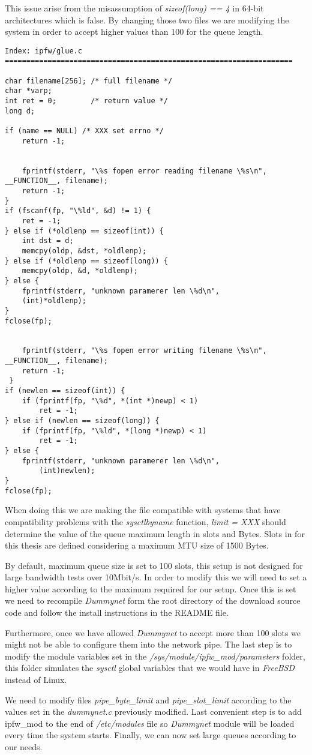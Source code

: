 This issue arise from the misassumption of {\it sizeof(long) == 4} in 64-bit architectures which is false. By changing those two files we are modifying the system in order to accept higher values than 100 for the queue length.

\lstset{language=C}
\begin{lstlisting}
Index: ipfw/glue.c
===================================================================

char filename[256];	/* full filename */
char *varp;
int ret = 0;		/* return value */
long d;
 
if (name == NULL) /* XXX set errno */
	return -1;


	fprintf(stderr, "\%s fopen error reading filename \%s\n", __FUNCTION__, filename);
	return -1;
}
if (fscanf(fp, "\%ld", &d) != 1) {
	ret = -1;
} else if (*oldlenp == sizeof(int)) {
	int dst = d;
	memcpy(oldp, &dst, *oldlenp);
} else if (*oldlenp == sizeof(long)) {
	memcpy(oldp, &d, *oldlenp);
} else {
	fprintf(stderr, "unknown paramerer len \%d\n",
	(int)*oldlenp);
}
fclose(fp);


	fprintf(stderr, "\%s fopen error writing filename \%s\n", __FUNCTION__, filename);
 	return -1;
 }
if (newlen == sizeof(int)) {
	if (fprintf(fp, "\%d", *(int *)newp) < 1)
		ret = -1;
} else if (newlen == sizeof(long)) {
	if (fprintf(fp, "\%ld", *(long *)newp) < 1)
		ret = -1;
} else {
	fprintf(stderr, "unknown paramerer len \%d\n",
		(int)newlen);
}
fclose(fp);

\end{lstlisting}

When doing this we are making the file compatible with systems that have compatibility problems with the {\it sysctlbyname} function, {\it limit = XXX} should determine the value of the queue maximum length in slots and Bytes. Slots in for this thesis are defined considering a maximum MTU size of 1500 Bytes.

By default, maximum queue size is set to 100 slots, this setup is not designed for large bandwidth tests over 10Mbit/s. In order to modify this we will need to set a higher value according to the maximum required for our setup. Once this is set we need to recompile {\it Dummynet} form the root directory of the download source code and follow the install instructions in the README file.

Furthermore, once we have allowed {\it Dummynet} to accept more than 100 slots we might not be able to configure them into the network pipe. The last step is to modify the module variables set in the {\it /sys/module/ipfw\_mod/parameters} folder, this folder simulates the {\it sysctl} global variables that we would have in {\it FreeBSD} instead of Linux. 

We need to modify files {\it pipe\_byte\_limit} and {\it pipe\_slot\_limit} according to the values set in the {\it dummynet.c} previously modified. Last convenient step is to add ipfw\_mod to the end of {\it /etc/modules} file so {\it Dummynet} module will be loaded every time the system starts. Finally, we can now set large queues according to our needs.